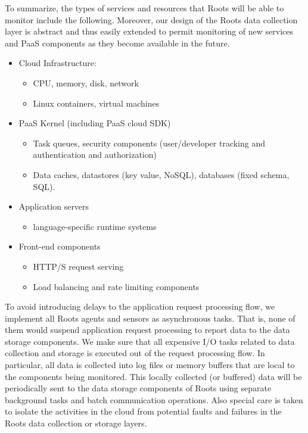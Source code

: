 To summarize, the types of services and resources that Roots will be able
to monitor include the following. Moreover, our design of the Roots data collection 
layer is abstract and thus easily extended to permit monitoring of new services 
and PaaS components as they become available in the future.
\begin{itemize}
\item Cloud Infrastructure: 
  \begin{itemize}
  \item CPU, memory, disk, network
  \item Linux containers, virtual machines
  \end{itemize}
\item PaaS Kernel (including PaaS cloud SDK)
  \begin{itemize}
  \item Task queues, security components (user/developer tracking and authentication and authorization)
  \item Data caches, datastores (key value, NoSQL), databases (fixed schema, SQL).
  \end{itemize}
\item Application servers
  \begin{itemize}
  \item language-specific runtime systems
  \end{itemize}
\item Front-end components
  \begin{itemize}
  \item HTTP/S request serving 
  \item Load balancing and rate limiting components
  \end{itemize}
\end{itemize}

To avoid introducing delays to the application request processing flow, we implement
all Roots agents and sensors as asynchronous tasks. That is, none of them would
suspend application request processing to report data to the data storage components.
We make sure that all expensive I/O tasks related to data collection and storage is
executed out of the request processing flow.
In particular, all data is collected into log files or memory buffers that are local to the components being
monitored. This locally collected (or buffered) data will be periodically sent
to the data storage components of Roots using separate background tasks and batch communication
operations. Also special care is taken to isolate the activities in the cloud from potential
faults and failures in the Roots data collection or storage layers. 

